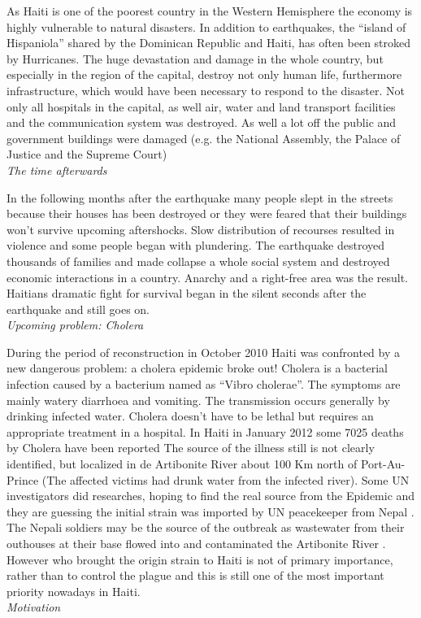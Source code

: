 \documentclass[11pt]{article}
\begin{document}
As Haiti is one of the poorest country in the Western Hemisphere  the economy is highly vulnerable to natural disasters. In addition to earthquakes, the “island of Hispaniola” shared by the Dominican Republic and Haiti, has often been stroked by Hurricanes. 
\newline
The huge devastation and damage in the whole country, but especially in the region of the capital, destroy not only human life, furthermore infrastructure, which would have been necessary to respond to the disaster. Not only all hospitals in the capital, as well air, water and land transport facilities and the communication system was destroyed. As well a lot off the public and government buildings were damaged (e.g. the National Assembly, the Palace of Justice and the Supreme Court)
\\[1em]
\noindent\textit{The time afterwards}

In the following months after the earthquake many people slept in the streets because their houses has been destroyed or they were feared that their buildings won’t survive upcoming aftershocks. Slow distribution of recourses resulted in violence and some people began with plundering.
\newline
The earthquake destroyed thousands of families and made collapse a whole social system and destroyed economic interactions in a country. Anarchy and a right-free area was the result. Haitians dramatic fight for survival began in the silent seconds after the earthquake and still goes on.
\\[1em]
\noindent\textit{Upcoming problem: Cholera}

During the period of reconstruction in October 2010 Haiti was confronted by a new dangerous problem: a cholera epidemic broke out! 
\newline
Cholera is a bacterial infection caused by a bacterium named as “Vibro cholerae”. The symptoms are mainly watery diarrhoea and vomiting. The transmission occurs generally by drinking infected water. Cholera doesn’t have to be lethal but requires an appropriate treatment in a hospital. In Haiti in January 2012 some 7025 deaths by Cholera have been reported 
The source of the illness still is not clearly identified, but localized in de Artibonite River about 100 Km north of Port-Au-Prince (The affected victims had drunk water from the infected river). Some UN investigators did researches, hoping to find the real source from the Epidemic and they are guessing the initial strain was imported by UN peacekeeper from Nepal . The Nepali soldiers may be the source of the outbreak as wastewater from their outhouses at their base flowed into and contaminated the Artibonite River  . However who brought the origin strain to Haiti is not of primary importance, rather than to control the plague and this is still one of the most important priority nowadays in Haiti.
\\[1em]
\noindent\textit{Motivation}
\end{document}

